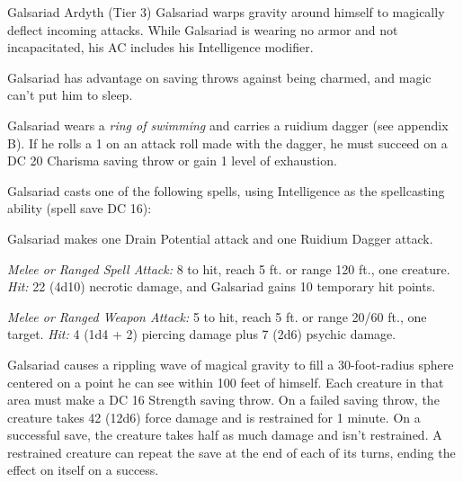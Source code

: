 \documentclass[10pt,a4paper,twoside,bg=print,twocolumn,openany,nodeprecatedcode]{dndbook}
\begin{document}
\begin{DndMonster}[float=t]{Galsariad Ardyth (Tier 3)}
\DndMonsterBasics[
armor-class = {17 (deflection)},
hit-points = {\DndDice{20d8}},
speed = {30 ft., fly 30 ft. \textit{(hover)}, swim 40 ft. \textit{(ring of swimming)}}
]
\DndMonsterAbilityScores[
 str = 8,
 dex = 14,
 con = 10,
 int = 20,
 wis = 15,
 cha = 12
]
\DndMonsterDetails[
saving-throws = {Int +8, Wis +5},
skills = {Arcana +8, Investigation +8, Nature +8},
senses = {darkvision 120 ft., passive perception 12},
languages = {Common, Draconic, Undercommon},
challenge = 8,
]
Galsariad warps gravity around himself to magically deflect incoming attacks. While Galsariad is wearing no armor and not incapacitated, his AC includes his Intelligence modifier.

Galsariad has advantage on saving throws against being charmed, and magic can't put him to sleep.

Galsariad wears a \textit{ring of swimming} and carries a ruidium dagger (see appendix B). If he rolls a 1 on an attack roll made with the dagger, he must succeed on a DC 20 Charisma saving throw or gain 1 level of exhaustion.

Galsariad casts one of the following spells, using Intelligence as the spellcasting ability (spell save DC 16):
\begin{DndMonsterSpells}
\end{DndMonsterSpells}
Galsariad makes one Drain Potential attack and one Ruidium Dagger attack.

\textsl{Melee or Ranged Spell Attack:} 8 to hit, reach 5 ft. or range 120 ft., one creature. \textsl{Hit:} 22 (4d10) necrotic damage, and Galsariad gains 10 temporary hit points.

\textsl{Melee or Ranged Weapon Attack:} 5 to hit, reach 5 ft. or range 20/60 ft., one target. \textsl{Hit:} 4 (1d4 + 2) piercing damage plus 7 (2d6) psychic damage.

Galsariad causes a rippling wave of magical gravity to fill a 30-foot-radius sphere centered on a point he can see within 100 feet of himself. Each creature in that area must make a DC 16 Strength saving throw. On a failed saving throw, the creature takes 42 (12d6) force damage and is restrained for 1 minute. On a successful save, the creature takes half as much damage and isn't restrained. A restrained creature can repeat the save at the end of each of its turns, ending the effect on itself on a success.


\end{DndMonster}
\end{document}
